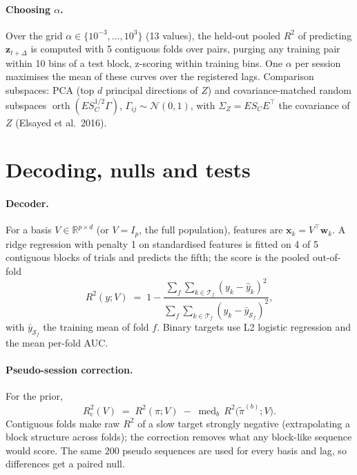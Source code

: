 \documentclass[11pt]{article}
\newcommand{\R}{\mathbb{R}}
\newcommand{\orth}{\operatorname{orth}}
\newcommand{\med}{\operatorname{med}}
\newcommand{\Rc}{R^2_{\mathrm{c}}}
\begin{document}
\paragraph{Choosing $\alpha$.} Over the grid $\alpha \in \{10^{-3}, \dots, 10^{3}\}$ (13 values), the held-out pooled
$R^2$ of predicting $\bm z_{t+\Delta}$ is computed with 5 contiguous folds over pairs, purging any training pair within
10 bins of a test block, z-scoring within training bins. One $\alpha$ per session maximises the mean of these curves
over the registered lags. Comparison subspaces: PCA (top $d$ principal directions of $Z$) and covariance-matched random
subspaces $\orth(E S_C^{1/2} \Gamma)$, $\Gamma_{ij} \sim \mathcal N(0,1)$, with $\Sigma_Z = E S_C E^\top$ the
covariance of $Z$ (Elsayed et al.\ 2016).

\section{Decoding, nulls and tests}

\paragraph{Decoder.} For a basis $V \in \R^{p \times d}$ (or $V = I_p$, the full population), features are
$\bm x_k = V^\top \bm w_k$. A ridge regression with penalty 1 on standardised features is fitted on 4 of 5 contiguous
blocks of trials and predicts the fifth; the score is the pooled out-of-fold
\begin{equation}
R^2(y; V) \;=\; 1 - \frac{\sum_f \sum_{k \in \mathcal T_f} (y_k - \hat y_k)^2}{\sum_f \sum_{k\in\mathcal T_f} (y_k - \bar y_{\mathcal S_f})^2},
\end{equation}
with $\bar y_{\mathcal S_f}$ the training mean of fold $f$. Binary targets use L2 logistic regression and the mean
per-fold AUC.

\paragraph{Pseudo-session correction.} For the prior,
\begin{equation}
\Rc(V) \;=\; R^2(\pi; V) \;-\; \med_{b}\, R^2\big(\tilde\pi^{(b)}; V\big).
\label{eq:Rc}
\end{equation}
Contiguous folds make raw $R^2$ of a slow target strongly negative (extrapolating a block structure across folds);
the correction removes what any block-like sequence would score. The same 200 pseudo sequences are used for every
basis and lag, so differences get a paired null.
\end{document}
